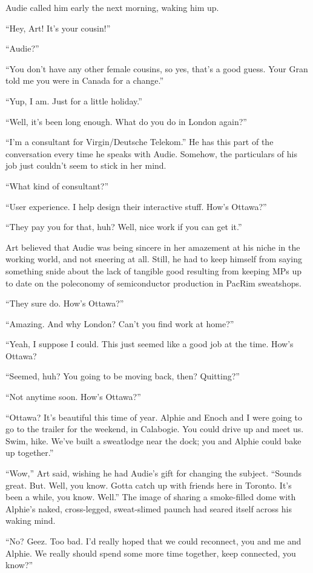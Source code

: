 Audie called him early the next morning, waking him up.

“Hey, Art! It’s your cousin!”

“Audie?”

“You don’t have any other female cousins, so yes, that’s a good
guess. Your Gran told me you were in Canada for a change.”

“Yup, I am. Just for a little holiday.”

“Well, it’s been long enough. What do you do in London again?”

“I’m a consultant for Virgin/Deutsche Telekom.” He has this part of
the conversation every time he speaks with Audie. Somehow, the
particulars of his job just couldn’t seem to stick in her mind.

“What kind of consultant?”

“User experience. I help design their interactive stuff. How’s
Ottawa?”

“They pay you for that, huh? Well, nice work if you can get it.”

Art believed that Audie was being sincere in her amazement at his
niche in the working world, and not sneering at all. Still, he had
to keep himself from saying something snide about the lack of
tangible good resulting from keeping MPs up to date on the
poleconomy of semiconductor production in PacRim sweatshops.

“They sure do. How’s Ottawa?”

“Amazing. And why London? Can’t you find work at home?”

“Yeah, I suppose I could. This just seemed like a good job at the
time. How’s Ottawa?

“Seemed, huh? You going to be moving back, then? Quitting?”

“Not anytime soon. How’s Ottawa?”

“Ottawa? It’s beautiful this time of year. Alphie and Enoch and I
were going to go to the trailer for the weekend, in Calabogie. You
could drive up and meet us. Swim, hike. We’ve built a sweatlodge
near the dock; you and Alphie could bake up together.”

“Wow,” Art said, wishing he had Audie’s gift for changing the
subject. “Sounds great. But. Well, you know. Gotta catch up with
friends here in Toronto. It’s been a while, you know. Well.” The
image of sharing a smoke-filled dome with Alphie’s naked,
cross-legged, sweat-slimed paunch had seared itself across his
waking mind.

“No? Geez. Too bad. I’d really hoped that we could reconnect, you
and me and Alphie. We really should spend some more time together,
keep connected, you know?”

